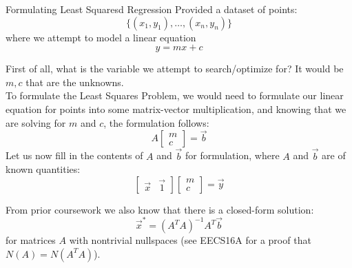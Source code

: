 \begin{ln-explain}{Formulating Least Squaresd Regression}{}
    Provided a dataset of points:
    \[\{(x_1, y_1), \dots, (x_n, y_n)\}\]
    where we attempt to model a linear equation
    \[y = mx + c\]
    
    First of all, what is the variable we attempt to search/optimize for? It would be $m, c$ that are the unknowns. \\
    To formulate the Least Squares Problem, we would need to formulate our linear equation for points into some matrix-vector multiplication, and knowing that we are solving for $m$ and $c$, the formulation follows:
    \[
        A
        \begin{bmatrix} m \\ c \end{bmatrix}
        = \vec{b}
    \]
    Let us now fill in the contents of $A$ and $\vec{b}$ for formulation, where $A$ and $\vec{b}$ are of known quantities:
    \[
        \begin{bmatrix} \vec{x} & \vec{1} \end{bmatrix}
        \begin{bmatrix} m \\ c \end{bmatrix}
        = \vec{y}
    \]
\end{ln-explain}
From prior coursework we also know that there is a closed-form solution:
\[\vec{x}^* = {(A^T A)}^{-1} A^T \vec{b}\]
for matrices $A$ with nontrivial nullspaces (see EECS16A for a proof that $N(A) = N(A^T A)$).

